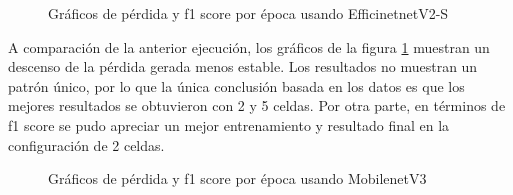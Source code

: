 \begin{figure}[h!]
    \centering
    \hfill
    \caption{Gráficos de pérdida y f1 score por época usando EfficinetnetV2-S}
    \label{fig:combinedEfficientnetV2}
\end{figure}

A comparación de la anterior ejecución, los gráficos de la figura 
\ref{fig:combinedEfficientnetV2} muestran un descenso de la pérdida 
gerada menos estable. Los resultados no muestran un patrón único, por 
lo que la única conclusión basada en los datos es que los mejores resultados 
se obtuvieron con 2 y 5 celdas. Por otra parte, en términos de f1 score se 
pudo apreciar un mejor entrenamiento y resultado final en la configuración de 
2 celdas. 

\begin{figure}[h!]
    \centering
    \hfill
    \caption{Gráficos de pérdida y f1 score por época usando MobilenetV3}
    \label{fig:MobilenetV3}
\end{figure}

